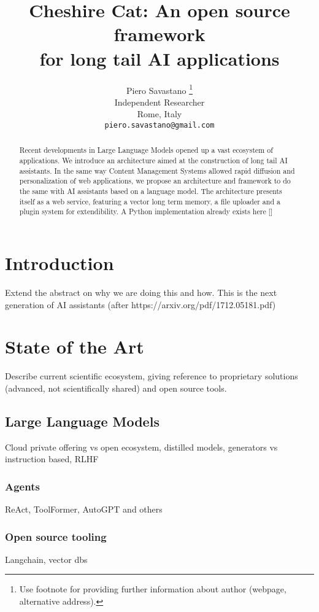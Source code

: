 \documentclass{article}
\title{Cheshire Cat: An open source framework\\for long tail AI applications}
\author{
Piero Savastano \thanks{Use footnote for providing further information about author (webpage, alternative address).} \\
Independent Researcher\\
Rome, Italy\\
\texttt{piero.savastano@gmail.com}\\}
\begin{document}
\maketitle

\begin{abstract}
Recent developments in Large Language Models opened up a vast ecosystem of applications.
We introduce an architecture aimed at the construction of long tail AI assistants.
In the same way Content Management Systems allowed rapid diffusion and personalization of web applications, we propose an architecture and framework to do the same with AI assistants based on a language model.
The architecture presents itself as a web service, featuring a vector long term memory, a file uploader and a plugin system for extendibility.
A Python implementation already exists here []
\end{abstract}




\section{Introduction}
Extend the abstract on why we are doing this and how.
This is the next generation of AI assistants (after https://arxiv.org/pdf/1712.05181.pdf)


\section{State of the Art}
Describe current scientific ecosystem, giving reference to proprietary solutions (advanced, not scientifically shared) and open source tools.

\subsection{Large Language Models}
Cloud private offering vs open ecosystem, distilled models, generators vs instruction based, RLHF

\subsubsection{Agents}
ReAct, ToolFormer, AutoGPT and others

\subsubsection{Open source tooling}
Langchain, vector dbs
\end{document}
